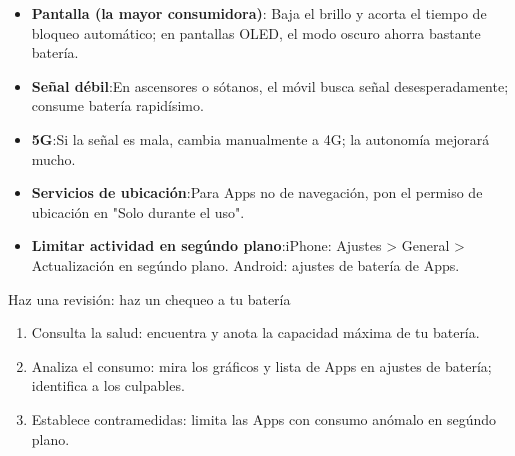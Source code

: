
\begin{itemize}
  \item \textbf{Pantalla (la mayor consumidora)}: Baja el brillo y acorta el tiempo de bloqueo automático; en pantallas OLED, el modo oscuro ahorra bastante batería.
  \item \textbf{Señal débil}:En ascensores o sótanos, el móvil busca señal desesperadamente; consume batería rapidísimo.
  \item \textbf{5G}:Si la señal es mala, cambia manualmente a 4G; la autonomía mejorará mucho.
  \item \textbf{Servicios de ubicación}:Para Apps no de navegación, pon el permiso de ubicación en "Solo durante el uso".
  \item \textbf{Limitar actividad en segúndo plano}:iPhone: Ajustes > General > Actualización en segúndo plano. Android: ajustes de batería de Apps.
\end{itemize}

\begin{tcbpractice}{Haz una revisión: haz un chequeo a tu batería}
\begin{enumerate}
  \item Consulta la salud: encuentra y anota la capacidad máxima de tu batería.
  \item Analiza el consumo: mira los gráficos y lista de Apps en ajustes de batería; identifica a los culpables.
  \item Establece contramedidas: limita las Apps con consumo anómalo en segúndo plano.
\end{enumerate}

\end{tcbpractice}
